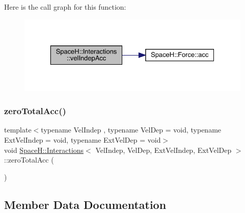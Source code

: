 Here is the call graph for this function\+:
\nopagebreak
\begin{figure}[H]
\begin{center}
\leavevmode
\includegraphics[width=329pt]{class_space_h_1_1_interactions_a5293a4d03004f7f454e3e1c7e7d04310_cgraph}
\end{center}
\end{figure}
\mbox{\label{class_space_h_1_1_interactions_aa92db94c7328bdec6eb1729749589b5a}} 
\subsubsection{\texorpdfstring{zero\+Total\+Acc()}{zeroTotalAcc()}}
{\footnotesize\ttfamily template$<$typename Vel\+Indep , typename Vel\+Dep  = void, typename Ext\+Vel\+Indep  = void, typename Ext\+Vel\+Dep  = void$>$ \\
void \mbox{\hyperlink{class_space_h_1_1_interactions}{Space\+H\+::\+Interactions}}$<$ Vel\+Indep, Vel\+Dep, Ext\+Vel\+Indep, Ext\+Vel\+Dep $>$\+::zero\+Total\+Acc (\begin{DoxyParamCaption}{ }\end{DoxyParamCaption})\hspace{0.3cm}{\ttfamily [inline]}}



\subsection{Member Data Documentation}
\mbox{\label{class_space_h_1_1_interactions_a99b83df9531e4eb96ed24c093241b9d8}} 
